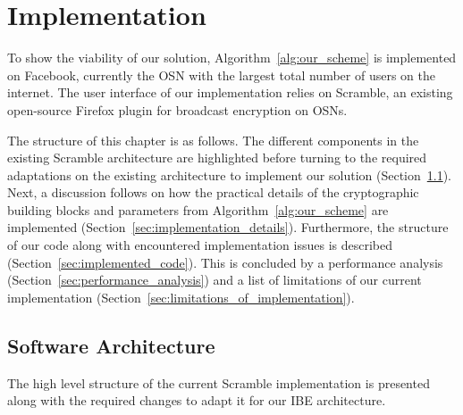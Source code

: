 \chapter{Implementation}
\label{cha:n}
To show the viability of our solution, Algorithm~\ref{alg:our_scheme} is implemented on Facebook, currently the OSN with the largest total number of users on the internet. The user interface of our implementation relies on Scramble, an existing open-source Firefox plugin for broadcast encryption on OSNs.

The structure of this chapter is as follows. The different components in the existing Scramble architecture are highlighted before turning to the required adaptations on the existing architecture to implement our solution (Section~\ref{sec:software_architecture}). Next, a discussion follows on how the practical details of the cryptographic building blocks and parameters from Algorithm~\ref{alg:our_scheme} are implemented (Section~\ref{sec:implementation_details}). Furthermore, the structure of our code along with encountered implementation issues is described (Section~\ref{sec:implemented_code}). This is concluded by a performance analysis (Section~\ref{sec:performance_analysis}) and a list of limitations of our current implementation (Section~\ref{sec:limitations_of_implementation}).



\section{Software Architecture}
\label{sec:software_architecture}
The high level structure of the current Scramble implementation is presented along with the required changes to adapt it for our IBE architecture.

